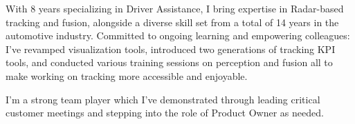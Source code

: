 

\begin{cvparagraph}
    With 8 years specializing in Driver Assistance, I bring expertise in Radar-based
    tracking and fusion, alongside a diverse skill set from a total of 14 years in the automotive industry.
    Committed to ongoing learning and empowering colleagues: I've revamped visualization tools, introduced two generations of tracking KPI tools, and conducted various training sessions on perception and fusion all to make working on tracking more accessible and enjoyable.
    
    I'm a strong team player which I've demonstrated through leading critical customer meetings and stepping into the role of Product Owner as needed.

\end{cvparagraph}
